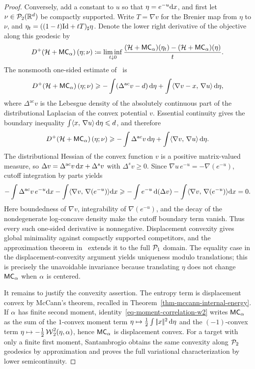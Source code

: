 \begin{proof}
	Conversely, add a constant to \(u\) so that \(\eta=e^{-u}\mathrm{d} x\), and first let \(\nu\in\mathcal{P}_2(\mathbb{R}^d)\) be compactly supported. Write \(T=\nabla v\) for the Brenier map from \(\eta\) to \(\nu\), and \(\eta_t=((1-t)\mathrm{Id}+tT)_\sharp\eta\). Denote the lower right derivative of the objective along this geodesic by
	\[
		D^+\!\left(\mathcal H+\mathsf{MC}_\alpha\right)(\eta;\nu)
		\coloneqq
		\liminf_{t\downarrow0}
		\frac{(\mathcal H+\mathsf{MC}_\alpha)(\eta_t)-(\mathcal H+\mathsf{MC}_\alpha)(\eta)}{t}.
	\]
	The nonsmooth one-sided estimate of~\cite{Santambrogio2015MomentMeasures} is
	\[
		D^+\!\left(\mathcal H+\mathsf{MC}_\alpha\right)(\eta;\nu)
		\geqslant
		-\int(\Delta^{\mathrm{ac}}v-d)\,\mathrm{d}\eta
		+\int\langle \nabla v-x,\,\nabla u\rangle\,\mathrm{d}\eta,
	\]
	where \(\Delta^{\mathrm{ac}}v\) is the Lebesgue density of the absolutely continuous part of the distributional Laplacian of the convex potential \(v\). Essential continuity gives the boundary inequality
	\(\int\langle x,\,\nabla u\rangle\,\mathrm{d}\eta\leqslant d\), and therefore
	\[
		D^+\!\left(\mathcal H+\mathsf{MC}_\alpha\right)(\eta;\nu)
		\geqslant
		-\int\Delta^{\mathrm{ac}}v\,\mathrm{d}\eta
		+\int\langle \nabla v,\,\nabla u\rangle\,\mathrm{d}\eta.
	\]
	The distributional Hessian of the convex function \(v\) is a positive matrix-valued measure, so
	\(\Delta v=\Delta^{\mathrm{ac}}v\,\mathrm{d} x+\Delta^s v\) with \(\Delta^s v\geq0\). Since \(\nabla u\,e^{-u}=-\nabla(e^{-u})\), cutoff integration by parts yields
	\[
		-\int\Delta^{\mathrm{ac}}v\,e^{-u}\mathrm{d} x
		-\int\langle \nabla v,\,\nabla(e^{-u})\rangle\mathrm{d} x
		\geqslant
		-\int e^{-u}\,\mathrm{d}(\Delta v)
		-\int\langle \nabla v,\,\nabla(e^{-u})\rangle\mathrm{d} x
		=0.
	\]
	Here boundedness of \(\nabla v\), integrability of \(\nabla(e^{-u})\), and the decay of the nondegenerate log-concave density make the cutoff boundary term vanish. Thus every such one-sided derivative is nonnegative. Displacement convexity gives global minimality against compactly supported competitors, and the approximation theorem in~\cite{Santambrogio2015MomentMeasures} extends it to the full \(\mathcal{P}_1\) domain. The equality case in the displacement-convexity argument yields uniqueness modulo translations; this is precisely the unavoidable invariance because translating \(\eta\) does not change \(\mathsf{MC}_\alpha\) when \(\alpha\) is centered.

	It remains to justify the convexity assertion. The entropy term is displacement convex by McCann's theorem, recalled in Theorem~\ref{thm-mccann-internal-energy}. If $\alpha$ has finite second moment, identity~\eqref{eq-moment-correlation-w2} writes $\mathsf{MC}_\alpha$ as the sum of the $1$-convex moment term $\eta\mapsto\frac12\int|\!| x |\!|^2\,\mathrm{d}\eta$ and the $(-1)$-convex term $\eta\mapsto-\frac12\operatorname{\mathcal{W}}_2^2(\eta,\alpha)$, hence $\mathsf{MC}_\alpha$ is displacement convex. For a target with only a finite first moment, Santambrogio obtains the same convexity along $\mathcal{P}_2$ geodesics by approximation and proves the full variational characterization by lower semicontinuity.
\end{proof}

